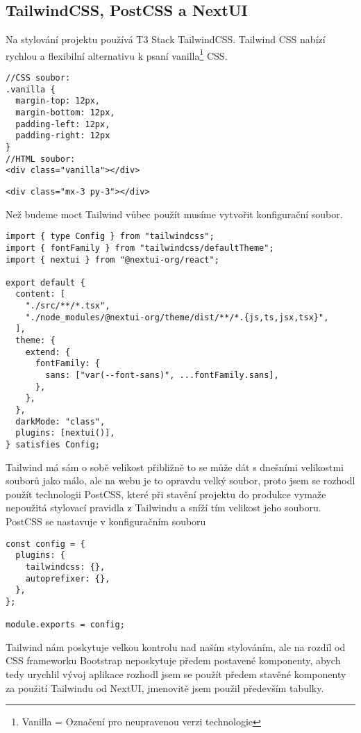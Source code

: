 \subsection{TailwindCSS, PostCSS a NextUI}
Na stylování projektu používá T3 Stack TailwindCSS. Tailwind CSS nabízí rychlou a flexibilní alternativu k psaní vanilla\footnote{Vanilla = Označení pro neupravenou verzi technologie} CSS.
\begin{lstlisting}[caption={Ukázka stylování HTML prvku za použití vanilla CSS\cite{tailwind-example}}]
//CSS soubor:
.vanilla {
  margin-top: 12px,
  margin-bottom: 12px,
  padding-left: 12px,
  padding-right: 12px
}
//HTML soubor:
<div class="vanilla"></div>
\end{lstlisting}
\begin{lstlisting}[caption={Ukázka stylování HTML prvku za použití TailwindCSS\cite{tailwind-example}}]
    <div class="mx-3 py-3"></div>
\end{lstlisting}
Než budeme moct Tailwind vůbec použít musíme vytvořit konfigurační soubor\newline{}.

\begin{lstlisting}[caption={Konfigurační soubor TailwindCSS}]
import { type Config } from "tailwindcss";
import { fontFamily } from "tailwindcss/defaultTheme";
import { nextui } from "@nextui-org/react";

export default {
  content: [
    "./src/**/*.tsx",
    "./node_modules/@nextui-org/theme/dist/**/*.{js,ts,jsx,tsx}",
  ],
  theme: {
    extend: {
      fontFamily: {
        sans: ["var(--font-sans)", ...fontFamily.sans],
      },
    },
  },
  darkMode: "class",
  plugins: [nextui()],
} satisfies Config;

\end{lstlisting}
Tailwind má sám o sobě velikost přibližně  to se může dát s dnešními velikostmi souborů jako málo, ale na webu je to opravdu velký soubor, proto jsem se rozhodl použít technologii PostCSS, které při stavění projektu do produkce vymaže nepoužitá stylovací pravidla z Tailwindu a sníží tím velikost jeho souboru. PostCSS se nastavuje v konfiguračním souboru 

\begin{lstlisting}[caption={Konfigurační soubor PostCSS}]
    const config = {
  plugins: {
    tailwindcss: {},
    autoprefixer: {},
  },
};

module.exports = config;
\end{lstlisting}
Tailwind nám poskytuje velkou kontrolu nad naším stylováním, ale na rozdíl od CSS frameworku Bootstrap neposkytuje předem postavené komponenty, abych tedy urychlil vývoj aplikace rozhodl jsem se použít předem stavěné komponenty za použití Tailwindu od NextUI\cite{nextui}, jmenovitě jsem použil především tabulky.

